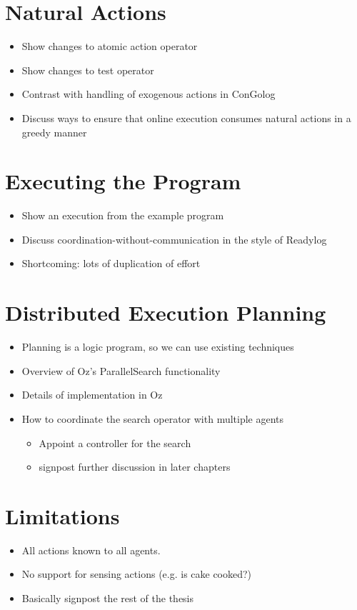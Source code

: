 \section{Natural Actions}
\begin{itemize}
\item Show changes to atomic action operator
\item Show changes to test operator
\item Contrast with handling of exogenous actions in ConGolog
\item Discuss ways to ensure that online execution consumes natural actions
in a greedy manner
\end{itemize}

\section{Executing the Program}
\begin{itemize}
\item Show an execution from the example program
\item Discuss coordination-without-communication in the style of Readylog
\item Shortcoming: lots of duplication of effort
\end{itemize}

\section{Distributed Execution Planning}
\begin{itemize}
\item Planning is a logic program, so we can use existing techniques
\item Overview of Oz's ParallelSearch functionality
\item Details of implementation in Oz
\item How to coordinate the search operator with multiple agents
  \begin{itemize}
  \item Appoint a controller for the search
  \item signpost further discussion in later chapters
  \end{itemize}
\end{itemize}

\section{Limitations}
\begin{itemize}
\item All actions known to all agents. 
\item No support for sensing actions (e.g. is cake cooked?)
\item Basically signpost the rest of the thesis
\end{itemize}

